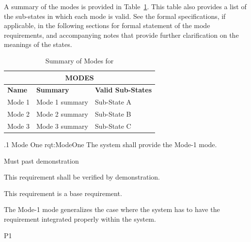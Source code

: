 
A summary of the modes is provided in Table~\ref{tab:Modes}.
This table also provides a list of the sub-states in which each mode is valid.
See the formal specifications, if applicable, in the following sections for formal statement of the mode requirements, and accompanying notes that provide further clarification on the meanings of the states.
\begin{table}[htbp]
	\begin{center}
		\begin{tabular}{|p{1.0in}|p{4.0in}|p{1.0in}|}
			\hline
			\hline
			     \multicolumn{3}{|c|}{{\bf MODES}}\\
			\hline
{\bf Name} & {\bf Summary}	& {\bf Valid Sub-States}\\
			\hline
			\hline
Mode 1 & Mode 1 summary & Sub-State A\\ \hline
Mode 2 & Mode 2 summary & Sub-State B\\ \hline
Mode 3 & Mode 3 summary & Sub-State C\\ 
			\hline
			\hline
			\end{tabular}
				\caption{Summary of Modes for \ThisSystem}
				\label{tab:Modes}
		\end{center}
\end{table}


\ONERQMTV
{\RqtNumberBase.1}
{Mode One}
{rqt:ModeOne}
{The system shall provide the Mode-1 mode.}
{
	\item [Phase 1] Must past demonstration
}
{This requirement shall be verified by demonstration.}
{
	\item [N/A] This requirement is a base requirement.
}
{
	\item The Mode-1 mode generalizes the case where the system has to have the requirement integrated properly within the system.
}
{P1}


